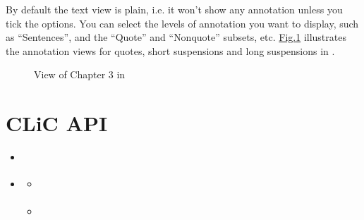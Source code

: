 \documentclass[letterpaper,10pt,english]{sphinxmanual}
\begin{document}
\sphinxAtStartPar
By default the text view is plain, i.e. it won’t show any annotation
unless you tick the options. You can select the levels of annotation you
want to display, such as “Sentences”, and the “Quote” and “Non\sphinxhyphen{}quote”
subsets, etc. \hyperref[\detokenize{clicanalysis/texts:figure-analysis-texts}]{Fig.\@ \ref{\detokenize{clicanalysis/texts:figure-analysis-texts}}} illustrates the annotation
views for quotes, short suspensions and long suspensions in .

\begin{figure}[htbp]
\centering
\capstart

\noindent{}
\caption{View of Chapter 3 in }\label{\detokenize{clicanalysis/texts:id2}}\label{\detokenize{clicanalysis/texts:figure-analysis-texts}}\end{figure}

\sphinxstepscope


\chapter{CLiC API}
\label{\detokenize{advanced/api_usage:clic-api}}\label{\detokenize{advanced/api_usage:api-usage}}\label{\detokenize{advanced/api_usage::doc}}
\begin{sphinxShadowBox}
\begin{itemize}
\item {} 
\sphinxAtStartPar
{}\label{\detokenize{advanced/api_usage:id1}}{\hyperref[\detokenize{advanced/api_usage:overview}]{}}

\item {} 
\sphinxAtStartPar
{}\label{\detokenize{advanced/api_usage:id2}}{\hyperref[\detokenize{advanced/api_usage:example-code}]{}}
\begin{itemize}
\item {} 
\sphinxAtStartPar
{}\label{\detokenize{advanced/api_usage:id3}}{\hyperref[\detokenize{advanced/api_usage:python-3}]{}}

\item {} 
\sphinxAtStartPar
{}\label{\detokenize{advanced/api_usage:id4}}{\hyperref[\detokenize{advanced/api_usage:r}]{}}

\end{itemize}

\end{itemize}
\end{sphinxShadowBox}
\end{document}
